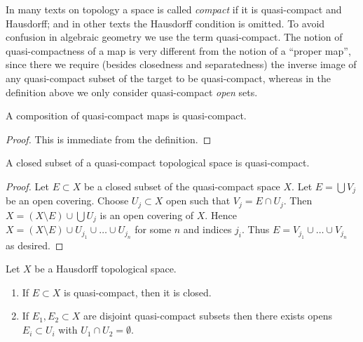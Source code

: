\noindent
In many texts on topology a space is called {\it compact} if it
is quasi-compact and Hausdorff; and in other texts the Hausdorff
condition is omitted. To avoid confusion in algebraic geometry
we use the term quasi-compact. The notion of quasi-compactness
of a map is very different from the notion of a ``proper map'',
since there we require (besides closedness and separatedness)
the inverse image of any quasi-compact subset of the target to be
quasi-compact, whereas in the definition above we only consider
quasi-compact {\it open} sets.

\begin{lemma}
\label{lemma-composition-quasi-compact}
A composition of quasi-compact maps is quasi-compact.
\end{lemma}

\begin{proof}
This is immediate from the definition.
\end{proof}

\begin{lemma}
\label{lemma-closed-in-quasi-compact}
A closed subset of a quasi-compact topological space is quasi-compact.
\end{lemma}

\begin{proof}
Let $E \subset X$ be a closed subset of the quasi-compact space $X$.
Let $E = \bigcup V_j$ be an open covering. Choose $U_j \subset X$
open such that $V_j = E \cap U_j$. Then $X = (X \setminus E) \cup \bigcup U_j$
is an open covering of $X$. Hence
$X = (X \setminus E) \cup U_{j_1} \cup \ldots \cup U_{j_n}$ for some
$n$ and indices $j_i$. Thus $E = V_{j_1} \cup \ldots \cup V_{j_n}$
as desired.
\end{proof}

\begin{lemma}
\label{lemma-quasi-compact-in-Hausdorff}
Let $X$ be a Hausdorff topological space.
\begin{enumerate}
\item If $E \subset X$ is quasi-compact, then it is closed.
\item If $E_1, E_2 \subset X$ are disjoint quasi-compact subsets
then there exists opens $E_i \subset U_i$ with $U_1 \cap U_2 = \emptyset$.
\end{enumerate}
\end{lemma}

